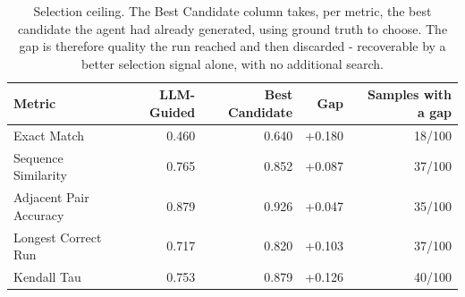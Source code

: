 \begin{table}[htbp]
  \centering
  \caption{Selection ceiling. The Best Candidate column takes, per metric, the best candidate the agent had already generated, using ground truth to choose. The gap is therefore quality the run reached and then discarded - recoverable by a better selection signal alone, with no additional search.}
  \label{tab:selection_ceiling}
  \begin{tabular}{lrrrr}
    \toprule
    Metric & LLM-Guided & Best Candidate & Gap & Samples with a gap \\
    \midrule
    Exact Match & 0.460 & 0.640 & +0.180 & 18/100 \\
    Sequence Similarity & 0.765 & 0.852 & +0.087 & 37/100 \\
    Adjacent Pair Accuracy & 0.879 & 0.926 & +0.047 & 35/100 \\
    Longest Correct Run & 0.717 & 0.820 & +0.103 & 37/100 \\
    Kendall Tau & 0.753 & 0.879 & +0.126 & 40/100 \\
    \bottomrule
  \end{tabular}
\end{table}
